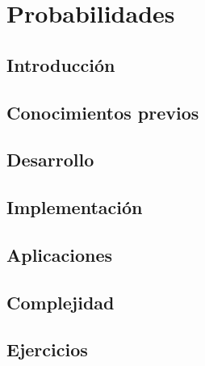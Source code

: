 \chapter{Probabilidades}
\section{Introducción}

\section{Conocimientos previos}

\section{Desarrollo}

\section{Implementación}

\section{Aplicaciones}

\section{Complejidad}

\section{Ejercicios}
